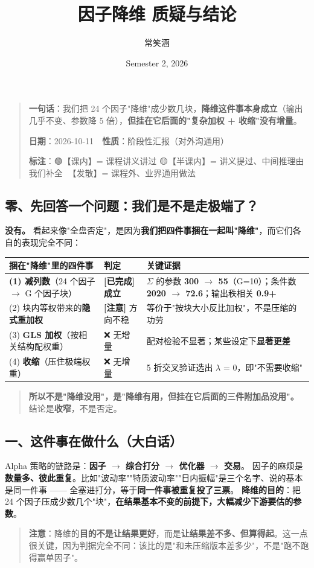 \documentclass[11pt]{article}
\title{因子降维 质疑与结论}
\author{常笑涵}
\date{Semester 2, 2026}
\begin{document}
\maketitle
\tableofcontents
\newpage
\begin{quote}
\textbf{一句话}：我们把 24 个因子"降维"成少数几块，\textbf{降维这件事本身成立}（输出几乎不变、参数降 5 倍），\textbf{但挂在它后面的"复杂加权 + 收缩"没有增量}。

\textbf{日期}：2026-10-11　\textbf{性质}：阶段性汇报（对外沟通用）

\textbf{标注}：🟢【课内】= 课程讲义讲过 \textperiodcentered{} 🟡【半课内】= 讲义提过、中间推理由我们补全 \textperiodcentered{} 🔴【发散】= 课程外、业界通用做法
\end{quote}
\subsection{\texorpdfstring{零、先回答一个问题：我们是不是走极端了？}{零、先回答一个问题：我们是不是走极端了？}}
\textbf{没有。} 看起来像"全盘否定"，是因为\textbf{我们把四件事捆在一起叫"降维"}，而它们各自的表现完全不同：
{\small
\begin{longtable}{p{5.02cm}p{1.63cm}p{9.54cm}}
\toprule
捆在"降维"里的四件事 & 判定 & 关键证据 \\
\midrule
\textbf{(1) 减列数}（24 个因子 \ensuremath{\rightarrow} G 个因子块） & \textbf{[已完成]} \textbf{成立} & \ensuremath{\Sigma} 的参数 \textbf{300 \ensuremath{\rightarrow} 55}（G=10）；条件数 \textbf{2020 \ensuremath{\rightarrow} 72.6}；输出秩相关 \textbf{0.9+} \\
(2) 块内等权带来的\textbf{隐式重加权} & \textbf{[注意]} 方向不稳 & 等价于"按块大小反比加权"，不是压缩的功劳 \\
(3) \textbf{GLS 加权}（按相关结构配权重） & ❌ 无增量 & 配对检验不显著；某些设定下\textbf{显著更差} \\
(4) \textbf{收缩}（压住极端权重） & ❌ 无增量 & 5 折交叉验证选出 \ensuremath{\lambda} = 0，即"不需要收缩" \\
\bottomrule
\end{longtable}
}
\begin{quote}
\textbf{所以不是"降维没用"，是"降维有用，但挂在它后面的三件附加品没用"。} 结论是\textbf{收窄}，不是否定。
\end{quote}
\subsection{\texorpdfstring{一、这件事在做什么（大白话）}{一、这件事在做什么（大白话）}}
Alpha 策略的链路是：\textbf{因子 \ensuremath{\rightarrow} 综合打分 \ensuremath{\rightarrow} 优化器 \ensuremath{\rightarrow} 交易}。
因子的麻烦是\textbf{数量多、彼此重复}。比如"波动率""特质波动率""日内振幅"是三个名字、说的基本是同一件事 ------ 全塞进打分，等于\textbf{同一件事被重复投了三票}。
\textbf{降维的目的}：把 24 个因子压成少数几个"块"，\textbf{在结果基本不变的前提下，大幅减少下游要估的参数}。
\begin{quote}
\textbf{注意}：降维的\textbf{目的不是让结果更好}，而是\textbf{让结果差不多、但算得起}。这一点很关键，因为判据完全不同：该比的是"和未压缩版本差多少"，不是"跑不跑得赢单因子"。
\end{quote}
\end{document}
